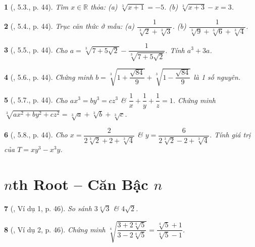 \documentclass{article}
\newtheorem{baitoan}{}
\begin{document}
\begin{baitoan}[\cite{Binh_boi_duong_Toan_9_tap_1}, 5.3., p. 44]
	Tìm $x\in\mathbb{R}$ thỏa: (a) $\sqrt[3]{x + 1} = -5$. (b) $\sqrt[3]{x + 3} - x = 3$.
\end{baitoan}

\begin{baitoan}[\cite{Binh_boi_duong_Toan_9_tap_1}, 5.4., p. 44]
	Trục căn thức ở mẫu: (a) $\dfrac{1}{\sqrt[3]{2} + \sqrt[3]{3}}$. (b) $\dfrac{1}{\sqrt[3]{9} + \sqrt[3]{6} + \sqrt[3]{4}}$.
\end{baitoan}

\begin{baitoan}[\cite{Binh_boi_duong_Toan_9_tap_1}, 5.5., p. 44]
	Cho $a = \sqrt[3]{7 + 5\sqrt{2}} - \dfrac{1}{\sqrt[3]{7 + 5\sqrt{2}}}$. Tính $a^3 + 3a$.
\end{baitoan}

\begin{baitoan}[\cite{Binh_boi_duong_Toan_9_tap_1}, 5.6., p. 44]
	Chứng minh $b = \sqrt[3]{1 + \dfrac{\sqrt{84}}{9}} + \sqrt[3]{1 - \dfrac{\sqrt{84}}{9}}$ là 1 số nguyên.
\end{baitoan}

\begin{baitoan}[\cite{Binh_boi_duong_Toan_9_tap_1}, 5.7., p. 44]
	Cho $ax^3 = by^3 = cz^3$ \& $\dfrac{1}{x} + \dfrac{1}{y} + \dfrac{1}{z} = 1$. Chứng minh $\sqrt[3]{ax^2 + by^2 + cz^2} = \sqrt[3]{a} + \sqrt[3]{b} + \sqrt[3]{c}$.
\end{baitoan}

\begin{baitoan}[\cite{Binh_boi_duong_Toan_9_tap_1}, 5.8., p. 44]
	Cho $x = \dfrac{2}{2\sqrt[3]{2} + 2 + \sqrt[3]{4}}$ \& $y = \dfrac{6}{2\sqrt[3]{2} - 2 + \sqrt[3]{4}}$. Tính giá trị của $T = xy^3 - x^3y$.
\end{baitoan}


\section{$n$th Root -- Căn Bậc $n$}

\begin{baitoan}[\cite{Binh_boi_duong_Toan_9_tap_1}, Ví dụ 1, p. 46]
	So sánh $3\sqrt[4]{3}$ \& $4\sqrt{2}$.
\end{baitoan}

\begin{baitoan}[\cite{Binh_boi_duong_Toan_9_tap_1}, Ví dụ 2, p. 46]
	Chứng minh $\sqrt[4]{\dfrac{3 + 2\sqrt[4]{5}}{3 - 2\sqrt[4]{5}}} = \dfrac{\sqrt[4]{5} + 1}{\sqrt[4]{5} - 1}$.
\end{baitoan}
\end{document}
